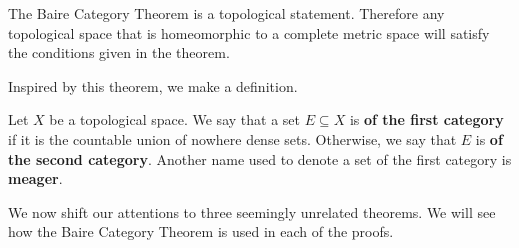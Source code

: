 \documentclass[a4paper,12pt]{report}
\newcommand{\sse} {\subseteq}
\newenvironment{definition}[1][Definition.]{\begin{trivlist}
\item[\hskip \labelsep {\bfseries #1}]}{\end{trivlist}}
\newenvironment{remark}[1][Remark.]{\begin{trivlist}
\item[\hskip \labelsep {\bfseries #1}]}{\end{trivlist}}
\begin{document}
	\begin{remark}
	The Baire Category Theorem is a topological statement. Therefore any topological space that is homeomorphic to a complete metric space will satisfy the conditions given in the theorem. 
	\end{remark}
	
	\noindent Inspired by this theorem, we make a definition.
	
	\begin{definition}
	Let $X$ be a topological space. We say that a set $E \sse X$ is \textbf{of the first category} if it is the countable union of nowhere dense sets. Otherwise, we say that $E$ is \textbf{of the second category}. Another name used to denote a set of the first category is \textbf{meager}.
	\end{definition}
	
	\noindent We now shift our attentions to three seemingly unrelated theorems. We will see how the Baire Category Theorem is used in each of the proofs.
	
\end{document}
